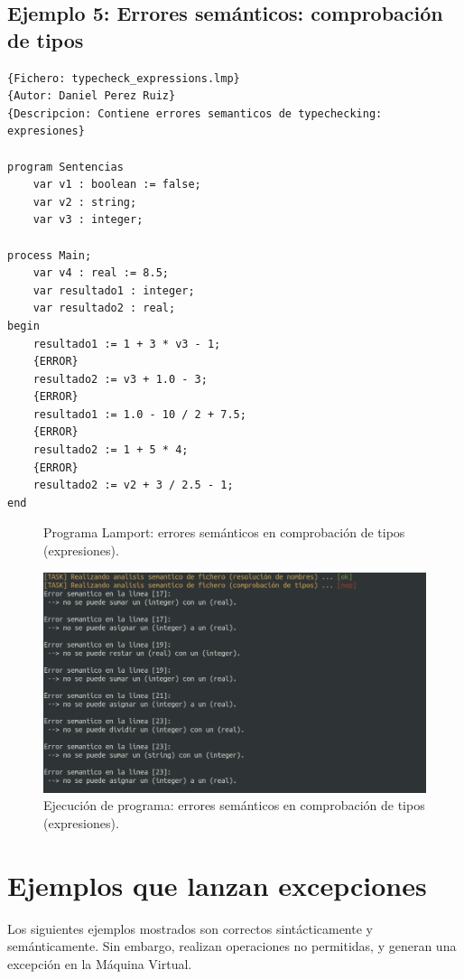 \newpage
\subsection{Ejemplo 5: Errores semánticos: comprobación de tipos}
\begin{lstlisting}[style=lamportStyle]
{Fichero: typecheck_expressions.lmp}
{Autor: Daniel Perez Ruiz}
{Descripcion: Contiene errores semanticos de typechecking: expresiones}

program Sentencias
	var v1 : boolean := false;
	var v2 : string;
	var v3 : integer;
	
process Main;
	var v4 : real := 8.5;
	var resultado1 : integer;
	var resultado2 : real;
begin
	resultado1 := 1 + 3 * v3 - 1;
	{ERROR}
	resultado2 := v3 + 1.0 - 3;
	{ERROR}
	resultado1 := 1.0 - 10 / 2 + 7.5;
	{ERROR}
	resultado2 := 1 + 5 * 4;
	{ERROR}
	resultado2 := v2 + 3 / 2.5 - 1;
end
\end{lstlisting}
\begin{figure}[h]
\caption{Programa Lamport: errores semánticos en comprobación de tipos (expresiones).}
\label{fig:lamportErrSemanticTypecheck}
\end{figure}

\newpage
\begin{figure}[h]
    \includegraphics[width=\linewidth]{images/ejemplos/err_semantic/typecheck.png}
    \caption{Ejecución de programa: errores semánticos en comprobación de tipos (expresiones).}
    \label{fig:lamportErrSemanticTypecheck_exec}
\end{figure}

\newpage
\section{Ejemplos que lanzan excepciones}
Los siguientes ejemplos mostrados son correctos sintácticamente y semánticamente. Sin embargo, realizan operaciones no permitidas, y generan una excepción en la Máquina Virtual.

